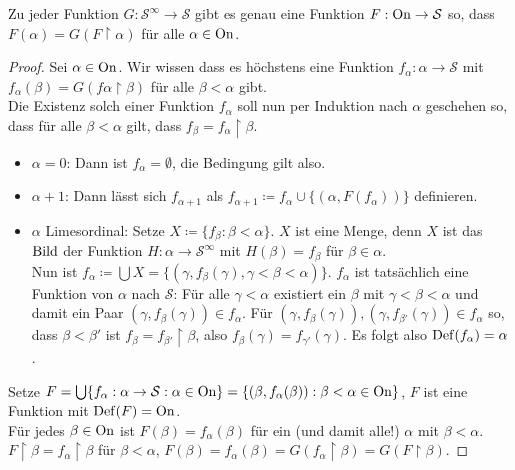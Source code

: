 \begin{satz}[Rekursionssatz]
	Zu jeder Funktion $G:\mathcal{S}^\infty\to\mathcal{S}$ gibt es genau eine Funktion $F:\operatorname{On}\to\mathcal{S}$ so, dass $F(\alpha)=G(F\upharpoonright\alpha)$ für alle $\alpha\in \operatorname{On}$.
\end{satz}
\begin{proof}
	Sei $\alpha\in \operatorname{On}$. Wir wissen dass es höchstens eine Funktion $f_\alpha:\alpha\to\mathcal{S}$ mit $f_\alpha(\beta)=G(f\alpha\upharpoonright\beta)$ für alle $\beta<\alpha$ gibt.
	\\
	Die Existenz solch einer Funktion $f_\alpha$ soll nun per Induktion nach $\alpha$ geschehen so, dass für alle $\beta<\alpha$ gilt, dass $f_\beta=f_\alpha\upharpoonright\beta$.
	
	\begin{itemize}
		\item $\alpha=0$: Dann ist $f_\alpha=\emptyset$, die Bedingung gilt also.
		
		\item $\alpha+1$: Dann lässt sich $f_{\alpha+1}$ als $f_{\alpha+1}\coloneqq f_\alpha\cup\{(\alpha, F(f_\alpha))\}$ definieren.
		
		\item $\alpha$ Limesordinal: Setze $X\coloneqq\{f_\beta : \beta < \alpha\}$. $X$ ist eine Menge, denn $X$ ist das $\operatorname{Bild}$ der Funktion $H:\alpha\to\mathcal{S}^\infty$ mit $H(\beta)=f_\beta$ für $\beta\in\alpha$.
		\\
		Nun ist $f_\alpha\coloneqq\bigcup X=\{(\gamma,f_\beta(\gamma), \gamma<\beta<\alpha)\}$. $f_\alpha$ ist tatsächlich eine Funktion von $\alpha$ nach $\mathcal{S}$: Für alle $\gamma<\alpha$ existiert ein $\beta$ mit $\gamma<\beta<\alpha$ und damit ein Paar $(\gamma,f_\beta(\gamma))\in f_\alpha$. Für $(\gamma,f_\beta(\gamma)),(\gamma,f_{\beta'}(\gamma))\in f_\alpha$ so, dass $\beta<\beta'$ ist $f_\beta=f_{\beta'}\upharpoonright \beta$, also $f_\beta(\gamma)=f_{\gamma'}(\gamma)$. Es folgt also $\operatorname{Def}(f_\alpha)=\alpha$.
	\end{itemize}
	
	Setze $F=\bigcup\{f_\alpha:\alpha\to\mathcal{S} : \alpha\in \operatorname{On}\}=\{(\beta, f_\alpha(\beta)):\beta<\alpha\in \operatorname{On}\}$, $F$ ist eine Funktion mit $\operatorname{Def}(F)=\operatorname{On}$.
	\\
	Für jedes $\beta\in \operatorname{On}$ ist $F(\beta)=f_\alpha(\beta)$ für ein (und damit alle!) $\alpha$ mit $\beta<\alpha$.
	\\
	$F\upharpoonright\beta=f_\alpha\upharpoonright\beta$ für $\beta<\alpha$, $F(\beta)=f_\alpha(\beta)=G(f_\alpha\upharpoonright\beta)=G(F\upharpoonright\beta)$.
\end{proof}

